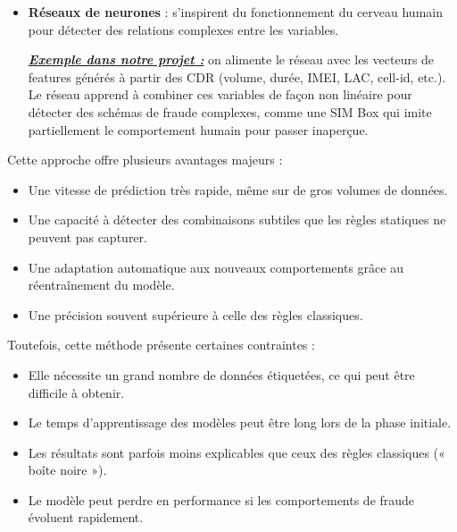 \documentclass[12pt, oneside, a4paper]{report}
\begin{document}
\begin{itemize}
\item \textbf{Réseaux de neurones} : s'inspirent du fonctionnement du cerveau humain pour détecter des relations complexes entre les variables.

\underline{\textit{\textbf{Exemple dans notre projet :}}} on alimente le réseau avec les vecteurs de features générés à partir des CDR (volume, durée, IMEI, LAC, cell-id, etc.). Le réseau apprend à combiner ces variables de façon non linéaire pour détecter des schémas de fraude complexes, comme une SIM Box qui imite partiellement le comportement humain pour passer inaperçue.
\end{itemize}
\vspace{0.5cm}
Cette approche offre plusieurs avantages majeurs :
\begin{itemize}
\item Une vitesse de prédiction très rapide, même sur de gros volumes de données.
\item Une capacité à détecter des combinaisons subtiles que les règles statiques ne peuvent pas capturer.
\item Une adaptation automatique aux nouveaux comportements grâce au réentraînement du modèle.
\item Une précision souvent supérieure à celle des règles classiques.
\end{itemize}

Toutefois, cette méthode présente certaines contraintes :
\begin{itemize}
\item Elle nécessite un grand nombre de données étiquetées, ce qui peut être difficile à obtenir.
\item Le temps d'apprentissage des modèles peut être long lors de la phase initiale.
\item Les résultats sont parfois moins explicables que ceux des règles classiques (« boîte noire »).
\item Le modèle peut perdre en performance si les comportements de fraude évoluent rapidement.
\end{itemize}
\end{document}
